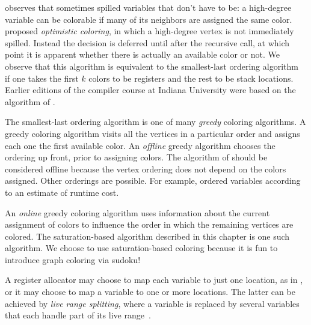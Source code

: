 \documentclass[7x10]{TimesAPriori_MIT}%
\numberwithin{theorem}{chapter}
\numberwithin{definition}{chapter}
\numberwithin{equation}{chapter}
\begin{document}
\citet{Briggs:1994kx} observes that \citet{Chaitin:1982vn} sometimes
spilled variables that don't have to be: a high-degree variable can be
colorable if many of its neighbors are assigned the same color.
\citet{Briggs:1994kx} proposed \emph{optimistic coloring}, in which a
high-degree vertex is not immediately spilled. Instead the decision is
deferred until after the recursive call, at which point it is apparent
whether there is actually an available color or not. We observe that
this algorithm is equivalent to the smallest-last ordering
algorithm~\citep{Matula:1972aa} if one takes the first $k$ colors to
be registers and the rest to be stack locations.
Earlier editions of the compiler course at Indiana University
\citep{Dybvig:2010aa} were based on the algorithm of
\citet{Briggs:1994kx}.

The smallest-last ordering algorithm is one of many \emph{greedy}
coloring algorithms. A greedy coloring algorithm visits all the
vertices in a particular order and assigns each one the first
available color. An \emph{offline} greedy algorithm chooses the
ordering up front, prior to assigning colors. The algorithm of
\citet{Chaitin:1981vl} should be considered offline because the vertex
ordering does not depend on the colors assigned.  Other orderings are
possible. For example, \citet{Chow:1984ys} ordered variables according
to an estimate of runtime cost.

An \emph{online} greedy coloring algorithm uses information about the
current assignment of colors to influence the order in which the
remaining vertices are colored. The saturation-based algorithm
described in this chapter is one such algorithm. We choose to use
saturation-based coloring because it is fun to introduce graph
coloring via sudoku!

A register allocator may choose to map each variable to just one
location, as in \citet{Chaitin:1981vl}, or it may choose to map a
variable to one or more locations. The latter can be achieved by
\emph{live range splitting}, where a variable is replaced by several
variables that each handle part of its live
range~\citep{Chow:1984ys,Briggs:1994kx,Cooper:1998ly}.



\end{document}
